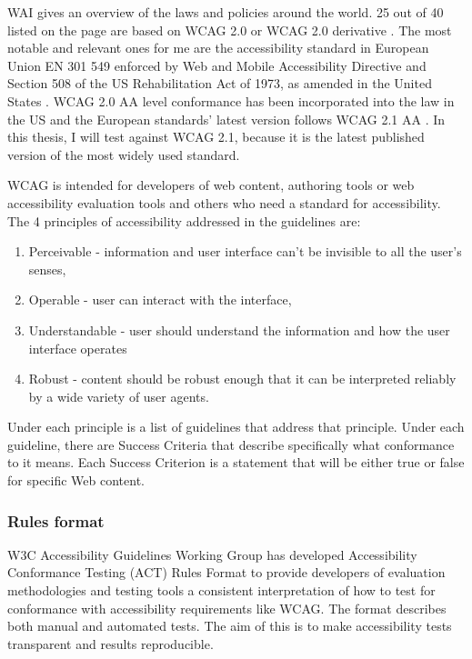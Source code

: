 \documentclass{master_thesis}
\begin{document}
WAI gives an overview of the laws and policies around the world. 25 out of 40 listed on the page are based on WCAG 2.0 or WCAG 2.0 derivative \citep{Mueller2018}. The most notable and relevant ones for me are the accessibility standard in European Union EN 301 549 enforced by Web and Mobile Accessibility Directive \citep{MuellerEU2017} and Section 508 of the US Rehabilitation Act of 1973, as amended in the United States \citep{MuellerUS2017}. WCAG 2.0 AA level conformance has been incorporated into the law in the US and the European standards' latest version follows WCAG 2.1 AA \citep{LevelAccess2021}. In this thesis, I will test against WCAG 2.1, because it is the latest published version of the most widely used standard.


WCAG is intended for developers of web content, authoring tools or web accessibility evaluation tools and others who need a standard for accessibility. The 4 principles of accessibility addressed in the guidelines are:
\begin{enumerate}
	\item Perceivable - information and user interface can't be invisible to all the user's senses,
	\item Operable - user can interact with the interface,
	\item Understandable - user should understand the information and how the user interface operates
	\item Robust - content should be robust enough that it can be interpreted reliably by a wide variety of user agents.
\end{enumerate}
Under each principle is a list of guidelines that address that principle. Under each guideline, there are Success Criteria that describe specifically what conformance to it means. Each Success Criterion is a statement that will be either true or false for specific Web content. \citep{AGWGWP2022}

\subsubsection{Rules format}

W3C Accessibility Guidelines Working Group has developed Accessibility Conformance Testing (ACT) Rules Format to provide developers of evaluation methodologies and testing tools a consistent interpretation of how to test for conformance with accessibility requirements like WCAG. The format describes both manual and automated tests. The aim of this is to make accessibility tests transparent and results reproducible. \citep{Fiers2019}
\end{document}
